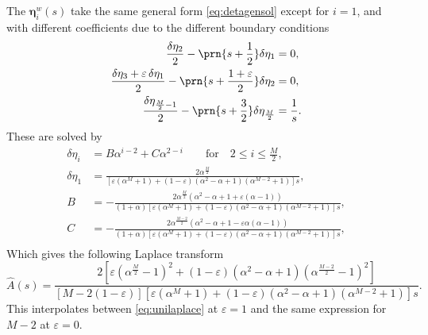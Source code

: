 \documentclass[12pt]{article}
\newcommand{\etw}{\boldsymbol{\eta}^w}
\begin{document}
The $\etw_i(s)$ take the same general form \eqref{eq:detagensol} except for $i=1$, and with different coefficients due to the different boundary conditions
%
\begin{equation}\label{eq:detabndshorten}
\begin{aligned}
  \frac{\delta\eta_2}{2} - \prn{s+\frac{1}{2}}\delta\eta_1 &= 0, \\
  \frac{\delta\eta_3 + \varepsilon\,\delta\eta_1}{2} - \prn{s+\frac{1+\varepsilon}{2}}\delta\eta_2 &= 0, \\
  \frac{\delta\eta_{\frac{M}{2}-1}}{2} - \prn{s+\frac{3}{2}}\delta\eta_{\frac{M}{2}} &= \frac{1}{s}.
\end{aligned}
\end{equation}
%
These are solved by
%
%
\begin{equation}\label{eq:shortensol}
\begin{aligned}
  \delta\eta_i &= B\alpha^{i-2} + C\alpha^{2-i} \qquad
        \text{for} \quad 2 \leq i \leq \frac{M}{2}, \\
  \delta\eta_1 &= \frac{2\alpha^{\frac{M}{2}}}
         {[\varepsilon(\alpha^{M}+1) + (1-\varepsilon)(\alpha^2-\alpha+1)(\alpha^{M-2}+1)]s}, \\
  B &= - \frac{2\alpha^{\frac{M}{2}}(\alpha^2-\alpha+1 + \varepsilon(\alpha-1))}
         {(1+\alpha)[\varepsilon(\alpha^{M}+1) + (1-\varepsilon)(\alpha^2-\alpha+1)(\alpha^{M-2}+1)]s}, \\
  C &= - \frac{2\alpha^{\frac{M-2}{2}}(\alpha^2-\alpha+1 - \varepsilon\alpha(\alpha-1))}
         {(1+\alpha)[\varepsilon(\alpha^{M}+1) + (1-\varepsilon)(\alpha^2-\alpha+1)(\alpha^{M-2}+1)]s}, \\
\end{aligned}
\end{equation}
%
Which gives the following Laplace transform
%
\begin{equation}\label{eq:shortenlaplace}
  \hat{A}(s) = \frac{2 [\varepsilon(\alpha^{\frac{M}{2}}-1)^2
          + (1-\varepsilon)(\alpha^2-\alpha+1)(\alpha^{\frac{M-2}{2}}-1)^2] }
          { [M-2(1-\varepsilon)]
            [\varepsilon(\alpha^{M}+1) + (1-\varepsilon)(\alpha^2-\alpha+1)(\alpha^{M-2}+1)]s }.
\end{equation}
%
This interpolates between \eqref{eq:unilaplace} at $\varepsilon=1$ and the same expression for $M-2$ at $\varepsilon=0$.
\end{document}
